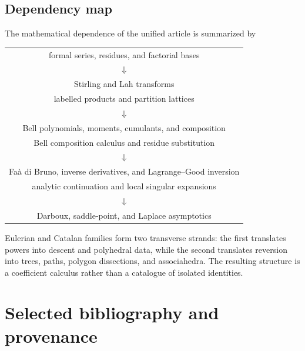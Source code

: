 \documentclass[11pt,a4paper,oneside,openany]{book}
\theoremstyle{definition}
\theoremstyle{remark}
\begin{document}
\section{Dependency map}
The mathematical dependence of the unified article is summarized by
\begin{center}
\renewcommand{\arraystretch}{1.15}
\begin{tabular}{c}
formal series, residues, and factorial bases\\
$\Downarrow$\\
Stirling and Lah transforms\\[1mm]
labelled products and partition lattices\\
$\Downarrow$\\
Bell polynomials, moments, cumulants, and composition\\[1mm]
Bell composition calculus and residue substitution\\
$\Downarrow$\\
Fa\`a di Bruno, inverse derivatives, and Lagrange--Good inversion\\[1mm]
analytic continuation and local singular expansions\\
$\Downarrow$\\
Darboux, saddle-point, and Laplace asymptotics
\end{tabular}
\renewcommand{\arraystretch}{1}
\end{center}
Eulerian and Catalan families form two transverse strands: the first translates
powers into descent and polyhedral data, while the second translates reversion into
trees, paths, polygon dissections, and associahedra.  The resulting structure is a
coefficient calculus rather than a catalogue of isolated identities.

\backmatter

\chapter*{Selected bibliography and provenance}
\end{document}

